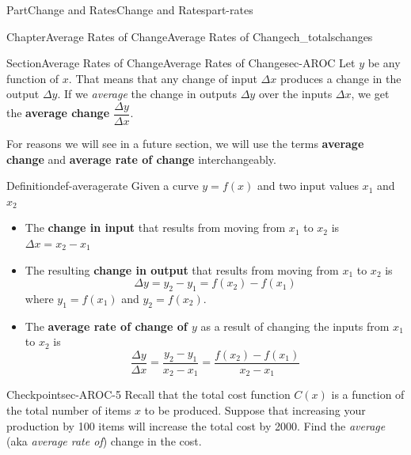 \documentclass{tufte-book}
\newcommand{\terminology}[1]{\textbf{#1}}
\numberwithin{equation}{chapter}
\begin{document}
\begin{partptx}{Part}{Change and Rates}{}{Change and Rates}{}{}{part-rates}
\begin{chapterptx}{Chapter}{Average Rates of Change}{}{Average Rates of Change}{}{}{ch_totalschanges}
\begin{introduction}{}
\begin{image}{0}{1}{0}{}
{
}%
\end{image}%
\end{introduction}%
%
%
\typeout{************************************************}
\typeout{************************************************}
%
\begin{sectionptx}{Section}{Average Rates of Change}{}{Average Rates of Change}{}{}{sec-AROC}
Let \(y\) be any function of \(x\). That means that any change of input \(\Delta x\) produces a change in the output \(\Delta y\). If we \emph{average} the change in outputs \(\Delta y\) over the inputs \(\Delta x\), we get the \terminology{average change} \(\dfrac{\Delta y}{\Delta x}\).%
\par
For reasons we will see in a future section, we will use the terms \terminology{average change} and \terminology{average rate of change} interchangeably.%
\begin{definition}{Definition}{}{def-averagerate}%
Given a curve \(y=f(x)\) and two input values \(x_1\) and \(x_2\)%
\begin{itemize}[label=\textbullet]
\item{}The \terminology{change in input} that results from moving from \(x_1\) to \(x_2\) is \(\Delta x = x_2-x_1\)%
\item{}The resulting \terminology{change in output} that results from moving from \(x_1\) to \(x_2\) is%
\begin{equation*}
\Delta y = y_2-y_1 = f(x_2) - f(x_1)
\end{equation*}
where \(y_1 = f(x_1)\) and \(y_2=f(x_2)\).%
\item{}The \terminology{average rate of change of \(y\)} as a result of changing the inputs from \(x_1\) to \(x_2\) is%
\begin{equation*}
\dfrac{\Delta y}{\Delta x} = \dfrac{y_2-y_1}{x_2-x_1} = \dfrac{f(x_2) - f(x_1)}{x_2-x_1}
\end{equation*}
%
\end{itemize}
%
\end{definition}
\begin{inlineexercise}{Checkpoint}{}{sec-AROC-5}%
Recall that the total cost function \(C(x)\) is a function of the total number of items \(x\) to be produced. Suppose that increasing your production by 100 items will increase the total cost by \textdollar{}2000. Find the \emph{average} (aka \emph{average rate of}) change in the cost.%

\end{inlineexercise}
\end{sectionptx}
\end{chapterptx}
\end{partptx}
\end{document}
